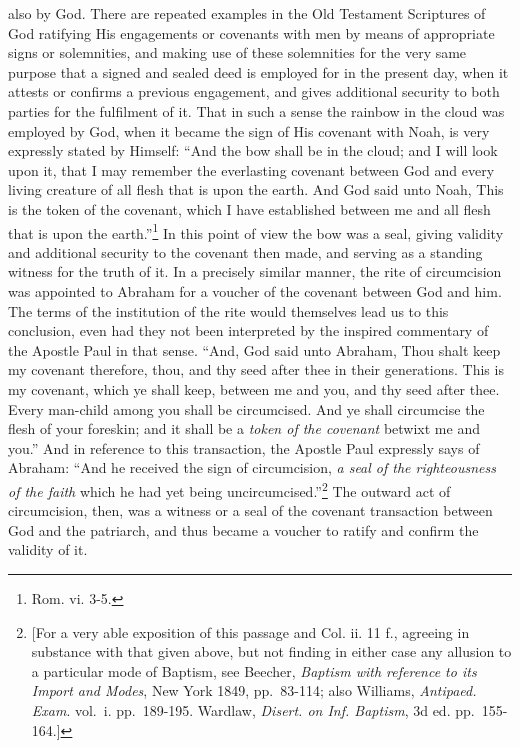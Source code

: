 \documentclass[]{book}
\begin{document}
also by God. There are repeated examples in the Old Testament Scriptures of God ratifying His engagements or covenants with men by means of appropriate signs or solemnities, and making use of these solemnities for the very same purpose that a signed and sealed deed is employed for in the present day, when it attests or confirms a previous engagement, and gives additional security to both parties for the fulfilment of it. That in such a sense the rainbow in the cloud was employed by God, when it became the sign of His covenant with Noah, is very expressly stated by Himself: ``And the bow shall be in the cloud; and I will look upon it, that I may remember the everlasting covenant between God and every living creature of all flesh that is upon the earth. And God said unto Noah, This is the token of the covenant, which I have established between me and all flesh that is upon the earth.''\footnote{Rom. vi. 3-5.} In this point of view the bow was a seal, giving validity and additional security to the covenant then made, and serving as a standing witness for the truth of it. In a precisely similar manner, the rite of circumcision was appointed to Abraham for a voucher of the covenant between God and him. The terms of the institution of the rite would themselves lead us to this conclusion, even had they not been interpreted by the inspired commentary of the Apostle Paul in that sense. ``And, God said unto Abraham, Thou shalt keep my covenant therefore, thou, and thy seed after thee in their generations. This is my covenant, which ye shall keep, between me and you, and thy seed after thee. Every man-child among you shall be circumcised. And ye shall circumcise the flesh of your foreskin; and it shall be a \emph{token of the covenant} betwixt me and you.'' And in reference to this transaction, the Apostle Paul expressly says of Abraham: ``And he received the sign of circumcision, \emph{a seal of the righteousness of the faith} which he had yet being uncircumcised.''\footnote{{[}For a very able exposition of this passage and Col. ii. 11 f., agreeing in substance with that given above, but not finding in either case any allusion to a particular mode of Baptism, see Beecher, \emph{Baptism with reference to its Import and Modes}, New York 1849, pp.~83-114; also Williams, \emph{Antipaed. Exam}. vol.~i. pp.~189-195. Wardlaw, \emph{Disert. on Inf. Baptism}, 3d ed. pp.~155-164.{]}} The outward act of circumcision, then, was a witness or a seal of the covenant transaction between God and the patriarch, and thus became a voucher to ratify and confirm the validity of it.
\end{document}

